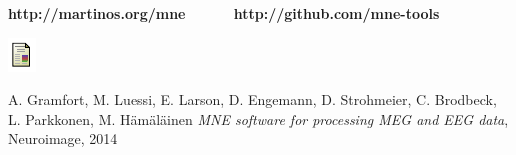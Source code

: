 \documentclass[t,11pt,compress]{beamer} %
\begin{document}
\begin{frame}[plain,t,c]
\begin{minipage}{\linewidth}
    \smallskip
    \vspace*{0.8ex}%
\center
{\huge\bfseries\sffamily http://martinos.org/mne~~~~~~http://github.com/mne-tools}
\end{minipage}

\begin{minipage}{\linewidth}
\smallskip
\centering
\begin{minipage}{0.05\linewidth}
    \includegraphics[width=0.9\linewidth]{paper_logo.pdf}%
\end{minipage}
\begin{minipage}{0.93\linewidth}
    A. Gramfort, M. Luessi, E. Larson, D. Engemann, D. Strohmeier, C. Brodbeck, L. Parkkonen, M. H\"am\"al\"ainen\hfill
    \emph{MNE software for processing MEG and EEG data}, Neuroimage, 2014
\end{minipage}\\
\begin{minipage}{0.05\linewidth}

\end{minipage}
\end{minipage}
\end{frame}
\end{document}
